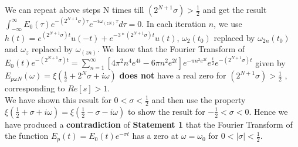 \documentclass[11pt]{elsarticle}
\begin{document}
We can repeat above steps N times till $(2^{N+1} \sigma) > \frac{1}{2}$ and get the result $\int_{-\infty}^{\infty}    E_0(\tau) e^{-(2^{N+1} \sigma) \tau} e^{-i \omega_{(zN)} \tau} d\tau = 0$. In each iteration $n$, we use $h(t)=  e^{ (2^{N+1} \sigma) t} u(-t) + e^{ - 3*(2^{N+1} \sigma) t} u(t) $, $\omega_2(t_0)$ replaced by $\omega_{2n}(t_0)$ and $\omega_z$ replaced by $\omega_{(zn)}$. We know that  the Fourier Transform of $E_{0}(t) e^{-(2^{N+1} \sigma) t} =    \sum_{n=1}^{\infty}  [ 4 \pi^{2} n^{4} e^{4t}    - 6 \pi n^{2}   e^{2t} ]  e^{- \pi n^{2} e^{2t}} e^{\frac{t}{2}} e^{-(2^{N+1} \sigma) t}$ given by $E_{p\omega N}(\omega)=\xi(\frac{1}{2}+ 2^N \sigma + i \omega)$ \textbf{does not} have a real zero for $(2^{N+1} \sigma) > \frac{1}{2}$ , corresponding to $Re[s] > 1$. \\%

We have shown this result for $0 < \sigma < \frac{1}{2}$ and then use the property $\xi(\frac{1}{2} + \sigma + i \omega) = \xi(\frac{1}{2} - \sigma - i \omega)$ to show the result for $-\frac{1}{2} < \sigma < 0$. Hence we have produced a \textbf{contradiction} of  \textbf{Statement 1} that the Fourier Transform of the function $E_p(t) = E_0(t) e^{-\sigma t} $ has a zero at $\omega = \omega_{0}$ for  $0 < |\sigma| < \frac{1}{2}$.
\end{document}
